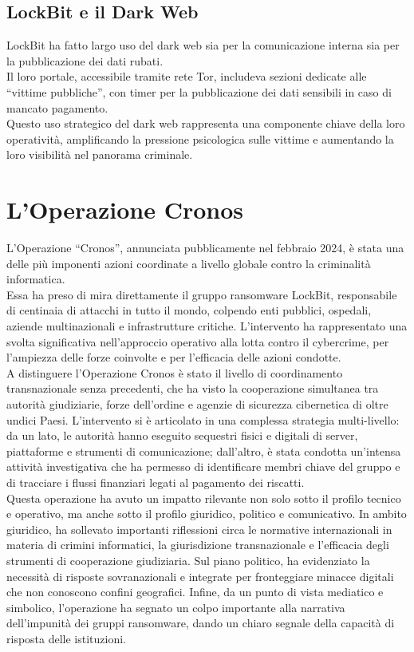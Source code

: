 \documentclass[a4paper,12pt]{article}
\begin{document}
\subsection{LockBit e il Dark Web}
LockBit ha fatto largo uso del dark web sia per la comunicazione interna sia per la pubblicazione dei dati rubati. \\
Il loro portale, accessibile tramite rete Tor, includeva sezioni dedicate alle “vittime pubbliche”, con timer per la pubblicazione dei dati sensibili in caso di mancato pagamento.\\
Questo uso strategico del dark web rappresenta una componente chiave della loro operatività, amplificando la pressione psicologica sulle vittime e aumentando la loro visibilità nel panorama criminale.

\section{L'Operazione Cronos}
L'Operazione “Cronos”, annunciata pubblicamente nel febbraio 2024, è stata una delle più imponenti azioni coordinate a livello globale contro la criminalità informatica.\\
Essa ha preso di mira direttamente il gruppo ransomware LockBit, responsabile di centinaia di attacchi in tutto il mondo, colpendo enti pubblici, ospedali, aziende multinazionali e infrastrutture critiche. L'intervento ha rappresentato una svolta significativa nell'approccio operativo alla lotta contro il cybercrime, per l'ampiezza delle forze coinvolte e per l'efficacia delle azioni condotte.\\
A distinguere l'Operazione Cronos è stato il livello di coordinamento transnazionale senza precedenti, che ha visto la cooperazione simultanea tra autorità giudiziarie, forze dell'ordine e agenzie di sicurezza cibernetica di oltre undici Paesi. L'intervento si è articolato in una complessa strategia multi-livello: da un lato, le autorità hanno eseguito sequestri fisici e digitali di server, piattaforme e strumenti di comunicazione; dall'altro, è stata condotta un'intensa attività investigativa che ha permesso di identificare membri chiave del gruppo e di tracciare i flussi finanziari legati al pagamento dei riscatti.\\
Questa operazione ha avuto un impatto rilevante non solo sotto il profilo tecnico e operativo, ma anche sotto il profilo giuridico, politico e comunicativo. In ambito giuridico, ha sollevato importanti riflessioni circa le normative internazionali in materia di crimini informatici, la giurisdizione transnazionale e l'efficacia degli strumenti di cooperazione giudiziaria. Sul piano politico, ha evidenziato la necessità di risposte sovranazionali e integrate per fronteggiare minacce digitali che non conoscono confini geografici. Infine, da un punto di vista mediatico e simbolico, l'operazione ha segnato un colpo importante alla narrativa dell'impunità dei gruppi ransomware, dando un chiaro segnale della capacità di risposta delle istituzioni.
\end{document}

